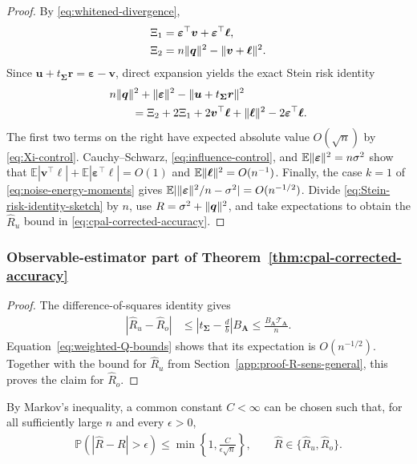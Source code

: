 \documentclass{article}
\theoremstyle{plain}
\theoremstyle{definition}
\theoremstyle{definition}
\DeclarePairedDelimiter\norm{\lVert}{\rVert}
\def\E{{\mathbb{E}}}
\def\P{{\mathbb{P}}}
\def\mathbold{\boldsymbol}
\def\cal{\mathcal}
\def\bA{\mathbold{A}}\def\calA{{\cal A}}\def\scrA{{\mathscr A}}\def\Ahat{\widehat{A}}\def\Atil{{\widetilde A}}
\def\bell{\mathbold{\ell}}\def\ellhat{\widehat{\ell}}\def\elltil{\widetilde{\ell}}\def\ellbar{{\overline \ell}}
\def\bq{\mathbold{q}}\def\qhat{\widehat{q}}\def\qtil{\widetilde{q}}\def\qbar{{\overline q}}
\def\br{\mathbold{r}}\def\rhat{\widehat{r}}\def\rtil{\widetilde{r}}\def\rbar{{\overline r}}
\def\bu{\mathbold{u}}\def\uhat{\widehat{u}}\def\util{\widetilde{u}}\def\ubar{{\overline u}}
\def\bv{\mathbold{v}}\def\vhat{\widehat{v}}\def\vtil{\widetilde{v}}\def\vbar{{\overline v}}
\def\ep{\varepsilon}\def\eps{\epsilon}\def\veps{\varepsilon}
\def\bep{ {\mathbold{\ep} }}
\def\bSigma{\mathbold{\Sigma}}\def\hbSigma{{\widehat{\bSigma}}}
\newcommand{\hR}{\hat{R}}
\begin{document}
\begin{proof}
By \eqref{eq:whitened-divergence},
\begin{align*}
    \Xi_1&=\bep^\top\bv+\bep^\top\bell,\\
    \Xi_2&=n\norm{\bq}^2-\norm{\bv+\bell}^2.
\end{align*}
Since $\bu+t_{\bSigma}\br=\bep-\bv$, direct expansion yields the exact Stein
risk identity
\begin{align}
    &n\norm{\bq}^2+\norm{\bep}^2-\norm{\bu+t_{\bSigma}\br}^2\notag\\
    &\qquad=
    \Xi_2+2\Xi_1+2\bv^\top\bell+\norm{\bell}^2
    -2\bep^\top\bell.
    \label{eq:Stein-risk-identity-sketch}
\end{align}
The first two terms on the right have expected absolute value $O(\sqrt n)$ by
\eqref{eq:Xi-control}.  Cauchy--Schwarz,
\eqref{eq:influence-control}, and
$\E\norm{\bep}^2=n\sigma^2$ show that
$\E|\bv^\top\bell|+\E|\bep^\top\bell|=O(1)$ and
$\E\norm{\bell}^2=O(n^{-1})$.  Finally, the case $k=1$ of
\eqref{eq:noise-energy-moments} gives
$\E|\norm{\bep}^2/n-\sigma^2|=O(n^{-1/2})$.
Divide \eqref{eq:Stein-risk-identity-sketch} by $n$, use
$R=\sigma^2+\norm{\bq}^2$, and take expectations to obtain
the $\hR_u$ bound in \eqref{eq:cpal-corrected-accuracy}.
\end{proof}

\subsubsection{Observable-estimator part of Theorem~\ref{thm:cpal-corrected-accuracy}}
\label{app:proof-R-obs-general}

\begin{proof}
The difference-of-squares identity gives
\begin{align*}
    |\hR_u-\hR_o|
    &\leq
    \left|t_{\bSigma}-\frac{d}{b}\right|B_{\bA}
    \leq \frac{B_{\bA}\mathcal T_{\bA}}{n}.
\end{align*}
Equation~\eqref{eq:weighted-Q-bounds} shows that its expectation is
$O(n^{-1/2})$. Together with the bound for $\hR_u$ from
Section~\ref{app:proof-R-sens-general}, this proves the claim for $\hR_o$.
\end{proof}

By Markov's inequality, a common constant $C<\infty$ can be chosen
such that, for all sufficiently large $n$ and every $\epsilon>0$,
\begin{align*}
    \P\left(|\widehat R-R|>\epsilon\right)
    \leq\min\left\{1,\frac{C}{\epsilon\sqrt n}\right\},
    \qquad
    \widehat R\in\{\hR_u,\hR_o\}.
\end{align*}
\end{document}
